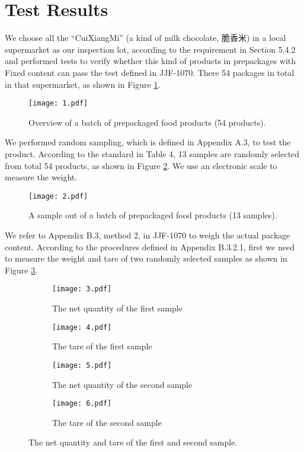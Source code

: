 \documentclass[conf]{new-aiaa}
\begin{document}
\newpage

\section{Test Results}
We choose all the ``CuiXiangMi'' (a kind of milk chocolate, 脆香米) in a local supermarket as our inspection lot, according to the requirement in Section 5.4.2 and performed tests to verify whether this kind of products in prepackages with Fixed content can pass the test defined in JJF-1070. There 54 packages in total in that supermarket, as shown in Figure \ref{fig:test_total}.

\begin{figure}[H]
    \centering
    \texttt{[image: 1.pdf]}
    \caption{Overview of a batch of prepackaged food products (54 products).}
    \label{fig:test_total}
\end{figure}

We performed random sampling, which is defined in Appendix A.3, to test the product. According to the standard in Table 4, 13 samples are randomly selected from total 54 products, as shown in Figure \ref{fig:test_sample}. We use an electronic scale to measure the weight.

\begin{figure}[H]
    \centering
    \texttt{[image: 2.pdf]}
    \caption{A sample out of a batch of prepackaged food products (13 samples).}
    \label{fig:test_sample}
\end{figure}

We refer to Appendix B.3, method 2, in JJF-1070 to weigh the actual package content. According to the procedures defined in Appendix B.3.2.1, first we need to measure the weight and tare of two randomly selected samples as shown in Figure \ref{fig:measure}.

\begin{figure}[H]
    \centering
    \begin{subfigure}[b]{0.45\textwidth}
        \centering
        \texttt{[image: 3.pdf]}
        \caption{The net quantity of the first sample}
    \end{subfigure}
    \hfill
    \begin{subfigure}[b]{0.45\textwidth}
        \centering
        \texttt{[image: 4.pdf]}
        \caption{The tare of the first sample}
    \end{subfigure}
    \hfill
    \begin{subfigure}[b]{0.45\textwidth}
        \centering
        \texttt{[image: 5.pdf]}
        \caption{The net quantity of the second sample}
    \end{subfigure}
    \hfill
    \begin{subfigure}[b]{0.45\textwidth}
        \centering
        \texttt{[image: 6.pdf]}
        \caption{The tare of the second sample}
    \end{subfigure}
    \caption{The net quantity and tare of the first and second sample.}
    \label{fig:measure}
\end{figure}
\end{document}
